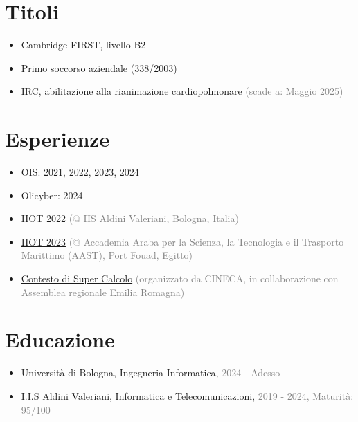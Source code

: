 \documentclass{paper}
\begin{document}
\section{Titoli}

\begin{itemize}
    \item Cambridge FIRST, livello B2
    \item Primo soccorso aziendale (338/2003)
    \item IRC, abilitazione alla rianimazione cardiopolmonare \textcolor{gray}{(scade a: Maggio 2025)}
\end{itemize}

\section{Esperienze}

\begin{itemize}
    \item OIS: 2021, 2022, 2023, 2024
    \item Olicyber: 2024

    \item IIOT 2022 \textcolor{gray}{(@ IIS Aldini Valeriani, Bologna, Italia)}
    \item \href{https://forum.olinfo.it/t/iiot-2023-diary/8278}{IIOT 2023} \textcolor{gray}{(@ Accademia Araba per la Scienza, la Tecnologia e il Trasporto Marittimo (AAST), Port Fouad, Egitto)}

    \item \href{https://www.ilrestodelcarlino.it/bologna/cronaca/sfida-tra-studenti-sul-supercalcolo-vincono-le-scuole-aldini-valeriani-8638a766}{Contesto di Super Calcolo} \textcolor{gray}{(organizzato da CINECA, in collaborazione con Assemblea regionale Emilia Romagna)}
\end{itemize}

\section{Educazione}

\begin{itemize}
    \item Università di Bologna, Ingegneria Informatica, \textcolor{gray}{2024 - Adesso}
    \item I.I.S Aldini Valeriani, Informatica e Telecomunicazioni, \textcolor{gray}{2019 - 2024, Maturità: 95/100}
\end{itemize}
\end{document}

